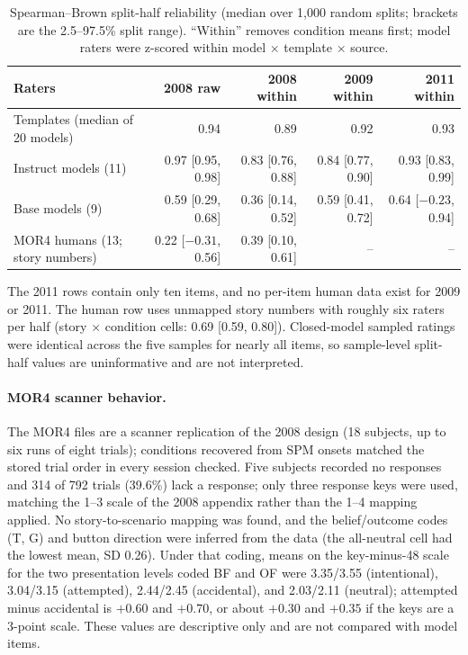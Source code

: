\begin{table}[h]
\centering
\footnotesize
\caption{Spearman--Brown split-half reliability (median over 1{,}000 random splits; brackets are the 2.5--97.5\% split range). ``Within'' removes condition means first; model raters were z-scored within model $\times$ template $\times$ source.}
\label{tab:reliability}
\begin{tabular}{@{}lrrrr@{}}
\toprule
Raters & 2008 raw & 2008 within & 2009 within & 2011 within \\
\midrule
Templates (median of 20 models) & 0.94 & 0.89 & 0.92 & 0.93 \\
Instruct models (11) & 0.97 [0.95, 0.98] & 0.83 [0.76, 0.88] & 0.84 [0.77, 0.90] & 0.93 [0.83, 0.99] \\
Base models (9) & 0.59 [0.29, 0.68] & 0.36 [0.14, 0.52] & 0.59 [0.41, 0.72] & 0.64 [$-0.23$, 0.94] \\
MOR4 humans (13; story numbers) & 0.22 [$-0.31$, 0.56] & 0.39 [0.10, 0.61] & -- & -- \\
\bottomrule
\end{tabular}
\end{table}

The 2011 rows contain only ten items, and no per-item human data exist for 2009 or 2011.
The human row uses unmapped story numbers with roughly six raters per half (story $\times$ condition cells: 0.69 [0.59, 0.80]).
Closed-model sampled ratings were identical across the five samples for nearly all items, so sample-level split-half values are uninformative and are not interpreted.

\paragraph{MOR4 scanner behavior.}
The MOR4 files are a scanner replication of the 2008 design (18 subjects, up to six runs of eight trials); conditions recovered from SPM onsets matched the stored trial order in every session checked.
Five subjects recorded no responses and 314 of 792 trials (39.6\%) lack a response; only three response keys were used, matching the 1--3 scale of the 2008 appendix rather than the 1--4 mapping applied.
No story-to-scenario mapping was found, and the belief/outcome codes (T, G) and button direction were inferred from the data (the all-neutral cell had the lowest mean, SD 0.26).
Under that coding, means on the key-minus-48 scale for the two presentation levels coded BF and OF were 3.35/3.55 (intentional), 3.04/3.15 (attempted), 2.44/2.45 (accidental), and 2.03/2.11 (neutral); attempted minus accidental is $+0.60$ and $+0.70$, or about $+0.30$ and $+0.35$ if the keys are a 3-point scale.
These values are descriptive only and are not compared with model items.

